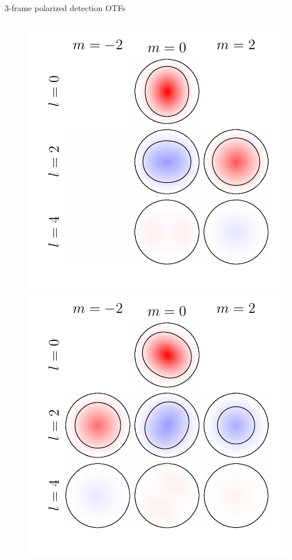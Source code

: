 \documentclass[presentation]{beamer}
\begin{document}
\begin{frame}[label=sec-1]{3-frame polarized detection OTFs}
\begin{columns}
\begin{column}{0.25\textwidth}
    \end{column}
    \begin{column}{0.25\textwidth}
      \centering      
      \includegraphics[width=1.0\columnwidth]{pol_detect3/otf0.pdf}\\
      \includegraphics[width=1.0\columnwidth]{pol_detect3/otf1.pdf}

\end{column}
\end{columns}
\end{frame}
\end{document}
